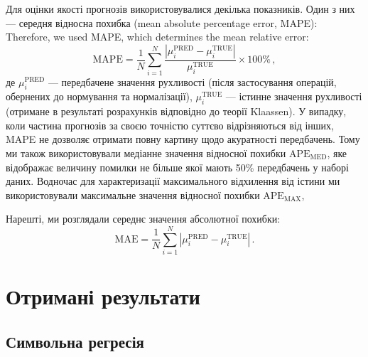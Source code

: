 \documentclass[12pt,a4paper,titlepage,oneside]{book}
\numberwithin{equation}{part}
\begin{document}
Для оцінки якості прогнозів використовувалися декілька показників.
Один з них --- середня відносна похибка (mean absolute percentage error, MAPE):
Therefore, we used MAPE, which determines the mean relative error:
\begin{equation}
\label{eqMAPE}
    \mathrm{MAPE} = \frac{1}{N}\displaystyle\sum_{i=1}^{N} \frac{|\mu^\mathrm{PRED}_i-\mu^\mathrm{TRUE}_i|}{\mu^\mathrm{TRUE}_i}\times 100 \%\,,
\end{equation}
де
$\mu^\mathrm{PRED}_i$ --- передбачене значення рухливості (після застосування операцій, обернених до нормування та нормалізації),
$\mu^\mathrm{TRUE}_i$ --- істинне значення рухливості (отримане в результаті розрахунків відповідно до теорії Klaassen).
У випадку, коли частина прогнозів за своєю точністю суттєво відрізняються від інших, MAPE  не дозволяє отримати повну картину щодо акуратності передбачень.
Тому ми також використовували медіанне значення відносної похибки $\mathrm{APE}_\mathrm{MED}$,
яке відображає величину помилки не більше якої мають 50\% передбачень у наборі даних.
Водночас для характеризації максимального відхилення від істини ми використовували максимальне значення  відносної похибки
$\mathrm{APE}_\mathrm{MAX}$,

Нарешті, ми розглядали середнє значення абсолютної похибки:
\begin{equation}
\label{eqMAE}
    \mathrm{MAE} = \frac{1}{N}\displaystyle\sum_{i=1}^{N} |\mu^\mathrm{PRED}_i-\mu^\mathrm{TRUE}_i|\,.
\end{equation}


\chapter{Отримані результати}

\section{Символьна регресія}
\end{document}
